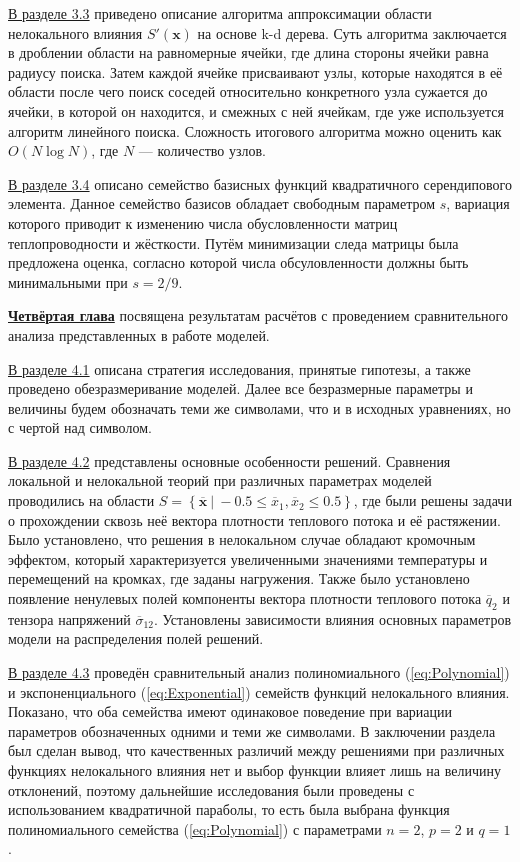 \underline{В разделе 3.3} приведено описание алгоритма аппроксимации области нелокального влияния $S'(\boldsymbol{x})$ на основе k-d дерева. Суть алгоритма заключается в дроблении области на равномерные ячейки, где длина стороны ячейки равна радиусу поиска. Затем каждой ячейке присваивают узлы, которые находятся в её области после чего поиск соседей относительно конкретного узла сужается до ячейки, в которой он находится, и смежных с ней ячейкам, где уже используется алгоритм линейного поиска. Сложность итогового алгоритма можно оценить как $O(N \log N)$, где $N$ --- количество узлов.

\underline{В разделе 3.4} описано семейство базисных функций квадратичного серендипового элемента. Данное семейство базисов обладает свободным параметром $s$, вариация которого приводит к изменению числа обусловленности матриц теплопроводности и жёсткости. Путём минимизации следа матрицы была предложена оценка, согласно которой числа обсуловленности должны быть минимальными при $s = 2/9$.

\underline{\textbf{Четвёртая глава}} посвящена результатам расчётов с проведением сравнительного анализа представленных в работе моделей.

\underline{В разделе 4.1} описана стратегия исследования, принятые гипотезы, а также проведено обезразмеривание моделей. Далее все безразмерные параметры и величины будем обозначать теми же символами, что и в исходных уравнениях, но с чертой над символом.

\underline{В разделе 4.2} представлены основные особенности решений. Сравнения локальной и нелокальной теорий при различных параметрах моделей проводились на области $S = \left\{ \overline{\boldsymbol{x}} \ | \ -0.5 \leqslant \overline{x}_1, \overline{x}_2 \leqslant 0.5 \right\}$, где были решены задачи о прохождении сквозь неё вектора плотности теплового потока и её растяжении. Было установлено, что решения в нелокальном случае обладают кромочным эффектом, который характеризуется увеличенными значениями температуры и перемещений на кромках, где заданы нагружения. Также было установлено появление ненулевых полей компоненты вектора плотности теплового потока $\overline{q}_2$ и тензора напряжений $\overline{\sigma}_{12}$. Установлены зависимости влияния основных параметров модели на распределения полей решений.

\underline{В разделе 4.3} проведён сравнительный анализ полиномиального (\ref{eq:Polynomial}) и экспоненциального (\ref{eq:Exponential}) семейств функций нелокального влияния. Показано, что оба семейства имеют одинаковое поведение при вариации параметров обозначенных одними и теми же символами. В заключении раздела был сделан вывод, что качественных различий между решениями при различных функциях нелокального влияния нет и выбор функции влияет лишь на величину отклонений, поэтому дальнейшие исследования были проведены с использованием квадратичной параболы, то есть была выбрана функция полиномиального семейства (\ref{eq:Polynomial}) с параметрами $n = 2$, $p = 2$ и $q = 1$.

